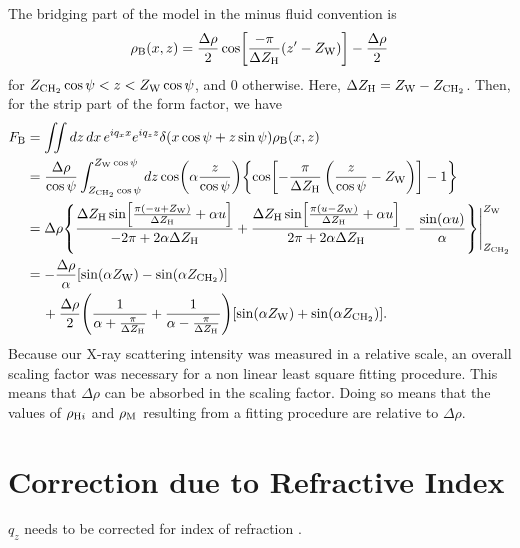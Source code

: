 The bridging part of the model in the minus fluid convention is 
\begin{align}
  \rho_\mathrm{B}(x,z) = \frac{\Delta\rho}{2} \cos \mathopen{}\left[ 
    \frac{-\pi}{\Delta Z_\mathrm{H}}(z'-Z_\mathrm{W}) \right]\mathclose{} - \frac{\Delta\rho}{2}
\end{align}
for $Z_\mathrm{CH_2}\cos\psi < z < Z_\mathrm{W}\cos\psi$, and 0 otherwise. Here,
$\Delta Z_\mathrm{H}=Z_\mathrm{W}-Z_\mathrm{CH_2}$.
Then, for the strip part of the form factor, we have
\begin{align}
  F_\mathrm{B} 
  &= \iint\mathop{dz}\mathop{dx} e^{iq_xx}e^{iq_zz} \delta(x\cos\psi+z\sin\psi) \rho_\mathrm{B}(x,z) \nonumber\\
  &= \frac{\Delta\rho}{\cos\psi}
     \int_{Z_\mathrm{CH_2}\cos\psi}^{Z_\mathrm{W}\cos\psi}\mathop{dz} \cos\mathopen{}\left( \alpha\frac{z}{\cos\psi} \right)\mathclose{} 
     \mathopen{}\left\lbrace \cos\mathopen{}\left[ -\frac{\pi}{\Delta Z_\mathrm{H}}\left(\frac{z}{\cos\psi}-Z_\mathrm{W}\right) \right]\mathclose{} - 1 \right\rbrace\mathclose{} \nonumber\\
  &= \Delta\rho \mathopen{}\left\lbrace 
       \frac{\Delta Z_\mathrm{H}\sin\mathopen{}\left[ \frac{\pi(-u+Z_\mathrm{W})}{\Delta Z_\mathrm{H}}+\alpha u \right]\mathclose{}}{-2\pi+2\alpha\Delta Z_\mathrm{H}}
       + \frac{\Delta Z_\mathrm{H}\sin\mathopen{}\left[ \frac{\pi(u-Z_\mathrm{W})}{\Delta Z_\mathrm{H}}+\alpha u \right]\mathclose{}}{2\pi+2\alpha\Delta Z_\mathrm{H}}
       - \frac{\sin(\alpha u)}{\alpha}  
      \right\rbrace\mathclose{}\Bigg|_{Z_\mathrm{CH_2}}^{Z_\mathrm{W}} \nonumber\\
  &= -\frac{\Delta\rho}{\alpha}\mathopen{}\left[ \sin(\alpha Z_\mathrm{W})-\sin(\alpha Z_\mathrm{CH_2}) \right]\mathclose{} \nonumber\\
  & \,\quad + \frac{\Delta\rho}{2} \mathopen{}\left( 
      \frac{1}{\alpha+\frac{\pi}{\Delta Z_\mathrm{H}}} 
      + \frac{1}{\alpha-\frac{\pi}{\Delta Z_\mathrm{H}}}
     \right)\mathclose{}\mathopen{}\left[ \sin(\alpha Z_\mathrm{W})+\sin(\alpha Z_\mathrm{CH_2}) \right]\mathclose{}.
\end{align}
Because our X-ray scattering intensity was measured in a relative scale, 
an overall scaling factor was necessary for a non linear least square 
fitting procedure. This means that $\Delta\rho$ can be absorbed in the 
scaling factor. Doing so means that the values of $\rho_{\mathrm{H}i}$ and $\rho_\mathrm{M}$
resulting from a fitting procedure are relative to $\Delta\rho$. 

\newpage
\section{Correction due to Refractive Index}\label{app:refraction}
$q_z$ needs to be corrected for index of refraction \cite{Liu03}. 

